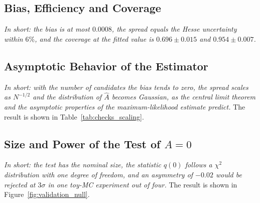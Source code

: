 \subsection{Bias, Efficiency and Coverage}
\emph{In short: the bias is at most $0.0008$, the spread equals the Hesse uncertainty within $6\%$, and the coverage at the fitted value is $0.696\pm0.015$ and $0.954\pm0.007$.}

\subsection{Asymptotic Behavior of the Estimator}
\label{sec:checks_scaling}
\emph{In short: with the number of candidates the bias tends to zero, the spread scales as $N^{-1/2}$ and the distribution of $\hat A$ becomes Gaussian, as the central limit theorem and the asymptotic properties of the maximum-likelihood estimate predict.}
The result is shown in Table~\ref{tab:checks_scaling}.

\begin{table}[h]
\centering
{}
\caption{Distribution of the maximum-likelihood estimate of $A$ in $300$ toy-MC datasets of $N$ candidates (six-parameter model of Sec.~\ref{sec:bayes_minimal}).}
\label{tab:checks_scaling}
\end{table}

\subsection{Size and Power of the Test of $A=0$}
\label{sec:validation_power}
\emph{In short: the test has the nominal size, the statistic $q(0)$ follows a $\chi^2$ distribution with one degree of freedom, and an asymmetry of $-0.02$ would be rejected at $3\sigma$ in one toy-MC experiment out of four.}
The result is shown in Figure~\ref{fig:validation_null}.


